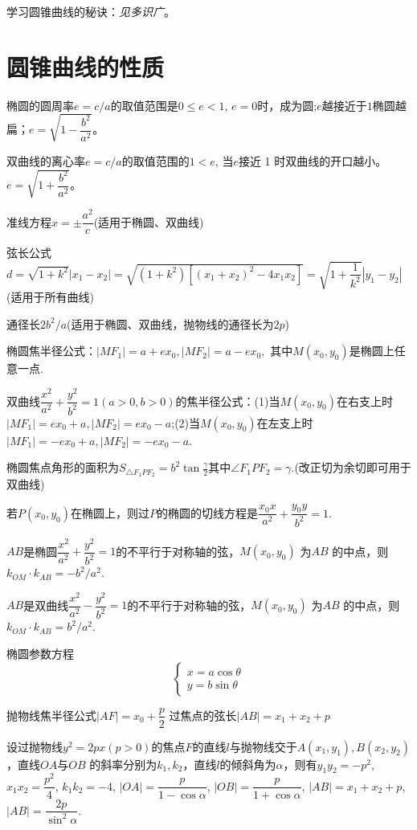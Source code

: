 \documentclass{article}
\begin{document}
学习圆锥曲线的秘诀：\emph{见多识广}。
\section{圆锥曲线的性质}
    \question 椭圆的圆周率$e=c/a$的取值范围是$0\le e<1$, $e=0$时，成为圆;$e$越接近于$1$椭圆越扁；$e=\sqrt{1-\dfrac{b^2}{a^2}}$。

    \question 双曲线的离心率$e=c/a$的取值范围的$1<e$, 当$e$接近 1 时双曲线的开口越小。$e=\sqrt{1+\dfrac{b^2}{a^2}}$。

    \question 准线方程$x=\pm \dfrac{a^2}{c}$(适用于椭圆、双曲线)

    \question 弦长公式 $d=\sqrt{1+k^2}|x_1-x_2|=\sqrt{(1+k^2)[(x_1+x_2)^2-4x_1x_2]}=\sqrt{1+\dfrac{1}{k^2}}|y_1-y_2|$ (适用于所有曲线)

    \question 通径长$2b^2/a$(适用于椭圆、双曲线，抛物线的通径长为$2p$)

    \question 椭圆焦半径公式：$|MF_1|=a+ex_0, |MF_2|=a-ex_0,$ 其中$M(x_0,y_0)$是椭圆上任意一点.

    \question 双曲线$\dfrac{x^2}{a^2}+\dfrac{y^2}{b^2}=1(a>0,b>0)$的焦半径公式：(1)当$M(x_0,y_0)$在右支上时$|MF_1|=ex_0+a, |MF_2|=ex_0-a$;(2)当$M(x_0,y_0)$在左支上时$|MF_1|=-ex_0+a, |MF_2|=-ex_0-a$.

    \question 椭圆焦点角形的面积为$S_{\triangle F_1PF_2}=b^2\tan\frac{\gamma}{2}$其中$\angle F_1PF_2=\gamma$.(改正切为余切即可用于双曲线)

    \question 若$P(x_0,y_0)$在椭圆上，则过$P$的椭圆的切线方程是$\dfrac{x_0x}{a^2}+\dfrac{y_0y}{b^2}=1$.

    \question $AB$是椭圆$\dfrac{x^2}{a^2}+\dfrac{y^2}{b^2}=1$的不平行于对称轴的弦，$M(x_0,y_0) $ 为$AB$ 的中点，则 $k_{OM}\cdot k_{AB}=-b^2/a^2$.

    \question $AB$是双曲线$\dfrac{x^2}{a^2}-\dfrac{y^2}{b^2}=1$的不平行于对称轴的弦，$M(x_0,y_0) $ 为$AB$ 的中点，则 $k_{OM}\cdot k_{AB}=b^2/a^2$.

    \question 椭圆参数方程$$\begin{cases}x=a\cos\theta\\y=b\sin\theta\end{cases}$$

    \question 抛物线焦半径公式$|AF|=x_0+\dfrac{p}{2}$ 过焦点的弦长$|AB|=x_1+x_2+p$

    \question 设过抛物线$y^2=2px(p>0)$的焦点$F$的直线$l$与抛物线交于$A(x_1,y_1),B(x_2,y_2)$，直线$OA$与$OB$ 的斜率分别为$k_1,k_2$，直线$l$的倾斜角为$\alpha$，则有$y_1y_2=-p^2$, $x_1x_2=\dfrac{p^2}{4}$, $k_1k_2=-4$, $|OA|=\dfrac{p}{1-\cos\alpha}$, $|OB|=\dfrac{p}{1+\cos\alpha}$, $|AB|=x_1+x_2+p$, $|AB|=\dfrac{2p}{{\sin}^2\alpha}$.
\end{document}

